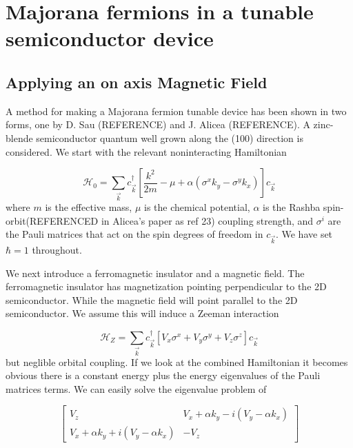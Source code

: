 \chapter{Majorana fermions in a tunable semiconductor device}
\section{Applying an on axis Magnetic Field}

A method for making a Majorana fermion tunable device has been shown in two forms, one by D. Sau (REFERENCE) and J. Alicea (REFERENCE). A zinc-blende semiconductor quantum well grown along the (100) direction is considered. We start with the relevant noninteracting Hamiltonian

\begin{equation}
  \mathcal{H}_0 = \sum\limits_{\vec{k}} c_{\vec{k}}^\dagger \left[\frac{k^2}{2m} - \mu + \alpha ( \sigma^x k_y - \sigma^y k_x) \right] c_{\vec{k}}
\end{equation}
where $m$ is the effective mass, $\mu$ is the chemical potential, $\alpha$ is the Rashba spin-orbit(REFERENCED in Alicea's paper as ref 23) coupling strength, and $\sigma^i$ are the Pauli matrices that act on the spin degrees of freedom in $c_{\vec{k}}$. We have set $\hbar=1$ throughout.

We next introduce a ferromagnetic insulator and a magnetic field. The ferromagnetic insulator has magnetization pointing perpendicular to the 2D semiconductor. While the magnetic field will point parallel to the 2D  semiconductor. We assume this will induce a Zeeman interaction

\begin{equation}
  \mathcal{H}_Z = \sum\limits_{\vec{k}} c_{\vec{k}}^\dagger \left[V_x \sigma^x + V_y \sigma^y + V_z \sigma^z \right] c_{\vec{k}}
\end{equation}
but neglible orbital coupling. If we look at the combined Hamiltonian it becomes obvious there is a constant energy plus the energy eigenvalues of the Pauli matrices terms. We can easily solve the eigenvalue problem of

\begin{equation}
  \begin{bmatrix}
    V_z & V_x + \alpha k_y - i(V_y - \alpha k_x) \\
    V_x + \alpha k_y + i(V_y -\alpha k_x) & -V_z
  \end{bmatrix}
\end{equation}

